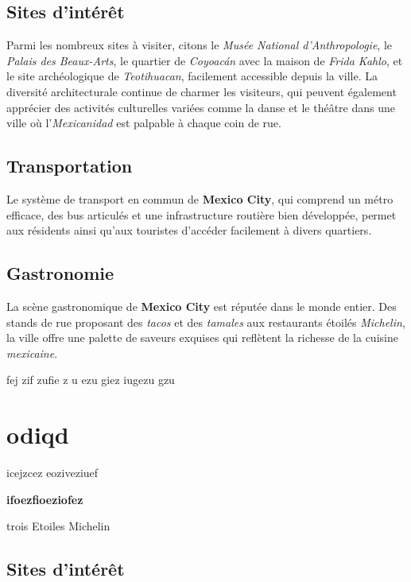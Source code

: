 \documentclass[12pt, a4paper]{article}
\begin{document}
\subsection*{\textbf{Sites d'intérêt}}

Parmi les nombreux sites à visiter, citons le \textit{Musée National d'Anthropologie}, le \textit{Palais des Beaux-Arts}, le quartier de \textit{Coyoacán} avec la maison de \textit{Frida Kahlo}, et le site archéologique de \textit{Teotihuacan}, facilement accessible depuis la ville.
La diversité architecturale continue de charmer les visiteurs, qui peuvent également apprécier des activités culturelles variées comme la danse et le théâtre dans une ville où l'\textit{Mexicanidad} est palpable à chaque coin de rue. \subsection*{\textbf{Transportation}} Le système de transport en commun de \textbf{Mexico City}, qui comprend un métro efficace, des bus articulés et une infrastructure routière bien développée, permet aux résidents ainsi qu'aux touristes d'accéder facilement à divers quartiers.

\subsection*{\textbf{Gastronomie}}

La scène gastronomique de \textbf{Mexico City} est réputée dans le monde entier. Des stands de rue proposant des \textit{tacos} et des \textit{tamales} aux restaurants étoilés \textit{Michelin}, la ville offre une palette de saveurs exquises qui reflètent la richesse de la cuisine \textit{mexicaine}.

fej zif zufie z
u ezu
giez iugezu gzu

\section{odiqd}
icejzcez
eoziveziuef

\textbf{ifoezfioeziofez}

trois Etoiles Michelin

\subsection*{\textbf{Sites d'intérêt}}
\end{document}
